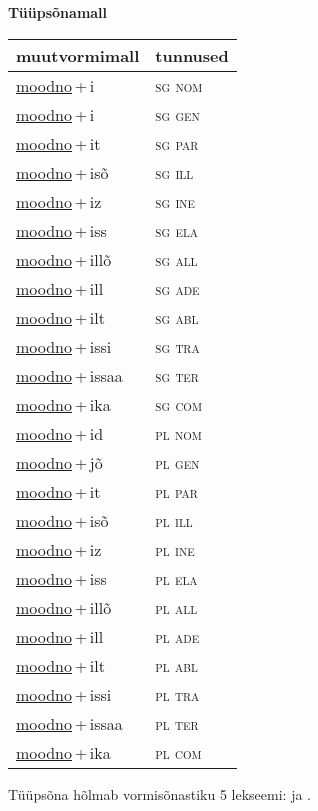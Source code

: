 
\vspace{1.8em}
\begin{minipage}{\textwidth}
\textbf{Tüüpsõnamall \,}\\

\begin{sideways}
\begin{tabular}{l l}
muutvormimall & tunnused \\
\hline
\underline{moodno}\,+\,i & \textsc{ sg nom } \\
\underline{moodno}\,+\,i & \textsc{ sg gen } \\
\underline{moodno}\,+\,it & \textsc{ sg par } \\
\underline{moodno}\,+\,isõ & \textsc{ sg ill } \\
\underline{moodno}\,+\,iz & \textsc{ sg ine } \\
\underline{moodno}\,+\,iss & \textsc{ sg ela } \\
\underline{moodno}\,+\,illõ & \textsc{ sg all } \\
\underline{moodno}\,+\,ill & \textsc{ sg ade } \\
\underline{moodno}\,+\,ilt & \textsc{ sg abl } \\
\underline{moodno}\,+\,issi & \textsc{ sg tra } \\
\underline{moodno}\,+\,issaa & \textsc{ sg ter } \\
\underline{moodno}\,+\,ika & \textsc{ sg com } \\
\underline{moodno}\,+\,id & \textsc{ pl nom } \\
\underline{moodno}\,+\,jõ & \textsc{ pl gen } \\
\underline{moodno}\,+\,it & \textsc{ pl par } \\
\underline{moodno}\,+\,isõ & \textsc{ pl ill } \\
\underline{moodno}\,+\,iz & \textsc{ pl ine } \\
\underline{moodno}\,+\,iss & \textsc{ pl ela } \\
\underline{moodno}\,+\,illõ & \textsc{ pl all } \\
\underline{moodno}\,+\,ill & \textsc{ pl ade } \\
\underline{moodno}\,+\,ilt & \textsc{ pl abl } \\
\underline{moodno}\,+\,issi & \textsc{ pl tra } \\
\underline{moodno}\,+\,issaa & \textsc{ pl ter } \\
\underline{moodno}\,+\,ika & \textsc{ pl com } \\
\end{tabular}
\end{sideways}
\label{tab:tüüpsõnamall-moodnoi}

\end{minipage}

 
\vspace{1em}
\noindent Tüüpsõna hõlmab vormisõnastiku 5 lekseemi:  ja .
